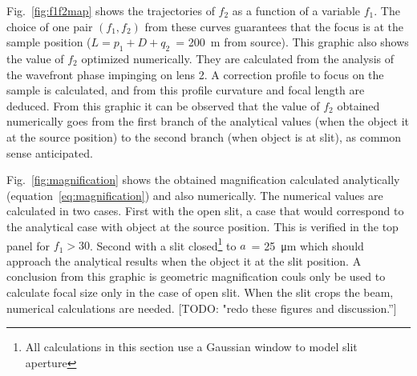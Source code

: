 \documentclass{iucr}              %
\newcommand{\todo}[1]{{\color{red}[TODO: "#1'']}}
\newcommand{\inblue}[1]{{\color{blue}#1}}
\begin{document}
Fig.~\ref{fig:f1f2map} shows the trajectories of $f_2$ as a function of a variable $f_1$. 
The choice of one pair $(f_1,f_2)$ from these curves guarantees that the focus is at the sample position ($L=p_1+D+q_2$~= \SI{200}{\meter} from source). This graphic also shows the value of $f_2$ optimized numerically. They are calculated from the analysis of the wavefront phase impinging on lens 2. A correction profile to focus on the sample is calculated, and from this profile curvature and focal length are deduced. From this graphic it can be observed that the value of $f_2$ obtained numerically goes from the first branch of the analytical values (when the object it at the source position) to  the second branch (when object is at slit), as common sense anticipated.  


Fig.~\ref{fig:magnification} shows the obtained magnification calculated analytically  (equation~\ref{eq:magnification}) and also numerically. The numerical values are calculated in two cases. First with the open slit, a case that would correspond to the analytical case with object at the source position. This is verified in the top panel for $f_1>30$. Second with a slit closed\footnote{All calculations in this section use a Gaussian window to model slit aperture} to $a$~= \SI{25}{\micro\meter} which should approach the analytical results when the object it at the slit position. 
\inblue{A conclusion from this graphic is geometric magnification couls only be used to calculate focal size only in the case of open slit. When the slit crops the beam, numerical calculations are needed.}
\todo{redo these figures and discussion.}
\end{document}
